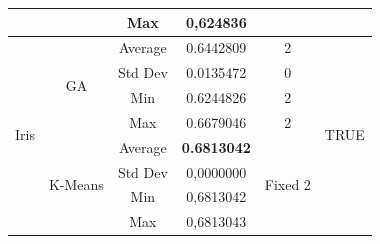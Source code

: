\documentclass[journal]{IEEEtran}
\begin{document}
\begin{table}[]
\begin{tabular}{|c|c|c|c|c|c|}
			&                               & Max                            & 0,624836                    &                          &                       \\ \hline
			\multirow{8}{*}{Iris}                  & \multirow{4}{*}{GA}           & Average                        & 0.6442809                   & 2                        & \multirow{8}{*}{TRUE} \\ \cline{3-5}
			&                               & Std Dev                        & 0.0135472                   & 0                        &                       \\ \cline{3-5}
			&                               & Min                            & 0.6244826                   & 2                        &                       \\ \cline{3-5}
			&                               & Max                            & 0.6679046                   & 2                        &                       \\ \cline{2-5}
			& \multirow{4}{*}{K-Means}      & Average                        & \textbf{0.6813042}                   & \multirow{4}{*}{Fixed 2} &                       \\ \cline{3-4}
			&                               & Std Dev                        & 0,0000000                   &                          &                       \\ \cline{3-4}
			&                               & Min                            & 0,6813042                   &                          &                       \\ \cline{3-4}
			&                               & Max                            & 0,6813043                   &                          &                       \\ \cline{3-4}							 \hline
		\end{tabular}
	\end{table}
	
\end{document}
